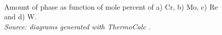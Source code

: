\begin{figure}[H]
  \centering
   \\
  \caption{\centering Amount of phase as function of mole percent of a) Cr, b) Mo, c) Re and d) W. \\
  \textit{Source: diagrams generated with \textit{ThermoCalc} \citep{thermocalc}.}}
  \label{fig:diagram04}
\end{figure}